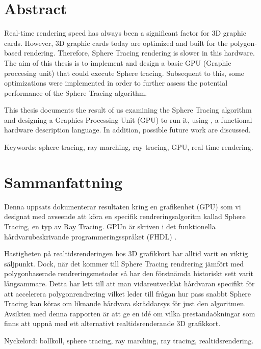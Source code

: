 \thispagestyle{plain}			%
\setlength{\parskip}{0pt plus 1.0pt}

\section*{Abstract}
	
	Real-time rendering speed has always been a significant factor for 3D
	graphic cards. However, 3D graphic cards today are optimized and built for
	the polygon-based rendering.  Therefore, Sphere Tracing rendering is slower
	in this hardware.  The aim of this thesis is to implement and design a
	basic GPU (Graphic proccesing unit) that could execute Sphere tracing.
	Subsequent to this, some optimizations were implemented in order to further
	assess the potential performance of the Sphere Tracing algorithm.
	
	This thesis documents the result of us examining the Sphere Tracing
	algorithm and designing a Graphics Processing Unit (GPU) to run it, using
	\clash, a functional hardware description language. In addition, possible
	future work are discussed.

	\vfill
	Keywords: sphere tracing, ray marching, ray tracing, GPU, real-time rendering.

\newpage
\thispagestyle{plain}

\section*{Sammanfattning}
	
	Denna uppsats dokumenterar resultaten kring en grafikenhet (GPU) som vi
	designat med avseende att köra en specifik rendreringsalgoritm kallad Sphere
	Tracing, en typ av Ray Tracing. GPUn är skriven i det funktionella
	hårdvarubeskrivande programmeringsspråket (FHDL) \clash.
	
	Hastigheten på realtidsrenderingen hos 3D grafikkort har alltid varit en
	viktig säljpunkt. Dock, när det kommer till Sphere Tracing rendrering jämfört
	med polygonbaserade rendreringsmetoder så har den förstnämda historiskt sett
	varit långsammare. Detta har lett till att man vidareutvecklat hårdvaran
	specifikt för att accelerera polygonrendrering vilket leder till frågan hur
	pass snabbt Sphere Tracing kan köras om liknande hårdvara skräddarsys för
	just den algoritmen. Avsikten med denna rapporten är att ge en idé om vilka
	prestandaökningar som finns att uppnå med ett alternativt realtidsrenderande
	3D grafikkort.
	
	\vfill
	Nyckelord: bollkoll, sphere tracing, ray marching, ray tracing, realtidsrendering.


\newpage
\thispagestyle{empty}
\mbox{}
